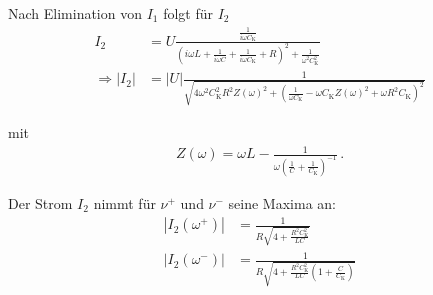 Nach Elimination von $I_{1}$ folgt für $I_{2}$ 
\begin{align}
    I_{2} &=U \frac{\frac{1}{i \omega C_\text{K}}}{\left(i \omega L+\frac{1}{i \omega C}+\frac{1}{i \omega C_\text{K}}+R\right)^{2}+\frac{1}{\omega^{2} C_\text{K}^{2}}} \label{eq:strom2} \\
    \Rightarrow\left|I_{2}\right| &=\lvert U\rvert \frac{1}{\sqrt{4 \omega^{2} C_\text{K}^{2} R^{2} Z(\omega)^{2}+\left(\frac{1}{\omega C_\text{K}}-\omega C_\text{K} Z(\omega)^{2}+\omega R^{2} C_\text{K}\right)^{2}}} \label{eq:betrag_strom2}     
\end{align}

mit
\begin{align}
    Z(\omega)=\omega L-\frac{1}{\omega\left(\frac{1}{C}+\frac{1}{C_\text{K}}\right)^{-1}} \,.
\end{align}

Der Strom $I_{2}$ nimmt für $\nu^+$ und $\nu^-$ seine Maxima an:
\begin{align}
    \left|I_{2}\left(\omega^{+}\right)\right| &= \frac{1}{R \sqrt{4+\frac{R^{2} C_\text{K}^{2}}{L C}}} \label{eq:strom2_omegaplus}\\
    \left|I_{2}\left(\omega^{-}\right)\right| &= \frac{1}{R \sqrt{4+\frac{R^{2} C_\text{K}^{2}}{L C}\left(1+\frac{C}{C_\text{K}}\right)}} \label{eq:strom2_omegaminus}
\end{align}
